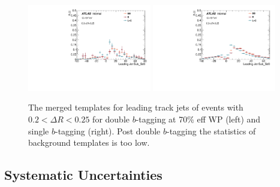 \begin{figure}[htbp]
  \centering
 \includegraphics[width=0.48\textwidth]{figures/gbb/Canv_FitTemplate_medium.pdf}
 \includegraphics[width=0.48\textwidth]{figures/gbb/Sub_Sd0_Fits/Canv_FitTemplate_02-DeltaR-025_LpT_INF_SpT_INF_x.pdf}\\
\caption{The merged templates for leading track jets of events with $0.2<\Delta R<0.25$ for double $b$-tagging at 70\% eff WP (left) and single $b$-tagging (right). Post double $b$-tagging the statistics of background templates is too low.}
 \label{fig:gbb-template-leadtight-medium}
\end{figure}


\subsection{Systematic Uncertainties}
\label{sec:gbb-sub_systematics}

